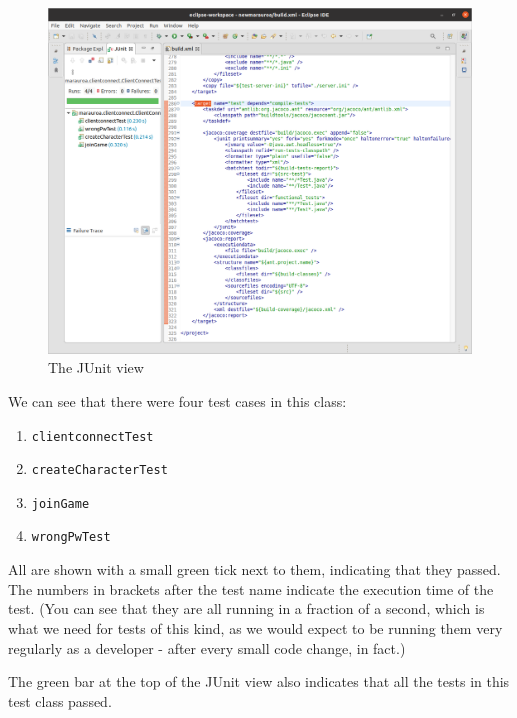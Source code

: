 \documentclass[
]{book}
\providecommand{\tightlist}{%
  \setlength{\itemsep}{0pt}\setlength{\parskip}{0pt}}
\begin{document}
\begin{figure}

{\centering \includegraphics[width=1\linewidth]{images/3.2.4showTestResultsForClientCoverage} 

}

\caption{The JUnit view}\label{fig:showTestResultsForClientCoverage-fig}
\end{figure}

We can see that there were four test cases in this class:

\begin{enumerate}
\def\labelenumi{\arabic{enumi}.}
\tightlist
\item
  \texttt{clientconnectTest}
\item
  \texttt{createCharacterTest}
\item
  \texttt{joinGame}
\item
  \texttt{wrongPwTest}
\end{enumerate}

All are shown with a small green tick next to them, indicating that they passed. The numbers in brackets after the test name indicate the execution time of the test. (You can see that they are all running in a fraction of a second, which is what we need for tests of this kind, as we would expect to be running them very regularly as a developer - after every small code change, in fact.)

The green bar at the top of the JUnit view also indicates that all the tests in this test class passed.
\end{document}
